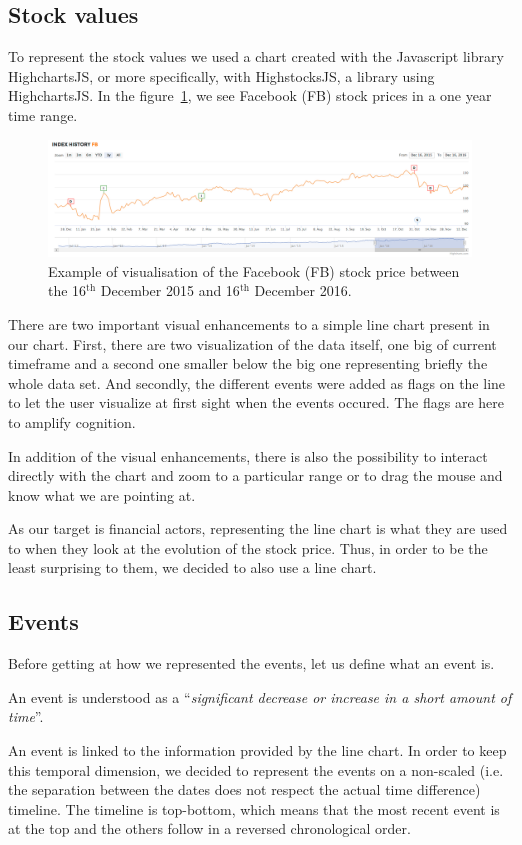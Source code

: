 \subsection{Stock values}
To represent the stock values we used a chart created with the Javascript library HighchartsJS, or more specifically, with HighstocksJS, a library using HighchartsJS. In the figure~\ref{fig:stockchart}, we see Facebook (FB) stock prices in a one year time range.
\begin{figure}
    \centering
    \includegraphics[scale=0.24]{Figures/stock-values.png}
    \caption{Example of visualisation of the Facebook (FB) stock price between the 16$^{\text{th}}$ December 2015 and 16$^{\text{th}}$ December 2016.}
    \label{fig:stockchart}
\end{figure}
There are two important visual enhancements to a simple line chart present in our chart. First, there are two visualization of the data itself, one big of current timeframe and a second one smaller below the big one representing briefly the whole data set. And secondly, the different events were added as flags on the line to let the user visualize at first sight when the events occured. The flags are here to amplify cognition.

In addition of the visual enhancements, there is also the possibility to interact directly with the chart and zoom to a particular range or to drag the mouse and know what we are pointing at.

As our target is financial actors, representing the line chart is what they are used to when they look at the evolution of the stock price. Thus, in order to be the least surprising to them, we decided to also use a line chart.

\subsection{Events}
Before getting at how we represented the events, let us define what an event is.
\begin{center}
    An event is understood as a ``\textit{significant decrease or increase in a short amount of time}''.
\end{center}
An event is linked to the information provided by the line chart. In order to keep this temporal dimension, we decided to represent the events on a non-scaled (i.e. the separation between the dates does not respect the actual time difference) timeline. The timeline is top-bottom, which means that the most recent event is at the top and the others follow in a reversed chronological order.

